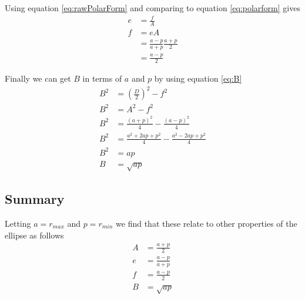 \documentclass[a5paper,12pt]{article}
\begin{document}
Using equation \ref{eq:rawPolarForm} and comparing to equation \ref{eq:polarform} gives
\begin{align}
e&=\frac{f}{A} \nonumber \\
f&=eA\nonumber \\
&=\frac{a-p}{a+p}\frac{a+p}{2} \nonumber \\
&=\frac{a-p}{2}
\end{align}

Finally we can get $B$ in terms of $a$ and $p$ by using equation \ref{eq:B}
\begin{subequations}
\begin{align}
B^2&=\left(\frac{D}{2}\right)^2-f^2 \\
B^2&=A^2-f^2 \\
B^2&=\frac{(a+p)^2}{4}-\frac{(a-p)^2}{4}\\
B^2&=\frac{a^2+2ap+p^2}{4}-\frac{a^2-2ap+p^2}{4}\\
B^2&=ap \\
B&=\sqrt{ap}
\end{align}
\end{subequations}
\begin{framed}
\subsection{Summary}

Letting $a=r_{max}$ and $p=r_{min}$ we find that these relate to other properties of the ellipse as follows
\begin{align*}
A&=\frac{a+p}{2} \\
e&=\frac{a-p}{a+p} \\
f&=\frac{a-p}{2} \\
B&=\sqrt{ap}
\end{align*}
\end{framed}
\clearpage
{}
\printindex
\end{document}
